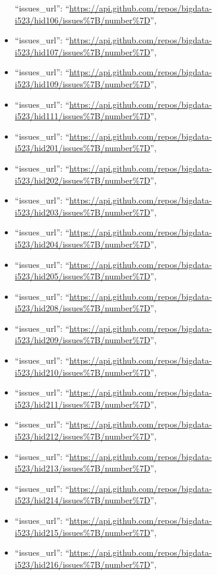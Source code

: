 \begin{itemize}
  ``issues\_url'':
  ``\url{https://api.github.com/repos/bigdata-i523/hid106/issues\%7B/number\%7D}'',
\item
  ``issues\_url'':
  ``\url{https://api.github.com/repos/bigdata-i523/hid107/issues\%7B/number\%7D}'',
\item
  ``issues\_url'':
  ``\url{https://api.github.com/repos/bigdata-i523/hid109/issues\%7B/number\%7D}'',
\item
  ``issues\_url'':
  ``\url{https://api.github.com/repos/bigdata-i523/hid111/issues\%7B/number\%7D}'',
\item
  ``issues\_url'':
  ``\url{https://api.github.com/repos/bigdata-i523/hid201/issues\%7B/number\%7D}'',
\item
  ``issues\_url'':
  ``\url{https://api.github.com/repos/bigdata-i523/hid202/issues\%7B/number\%7D}'',
\item
  ``issues\_url'':
  ``\url{https://api.github.com/repos/bigdata-i523/hid203/issues\%7B/number\%7D}'',
\item
  ``issues\_url'':
  ``\url{https://api.github.com/repos/bigdata-i523/hid204/issues\%7B/number\%7D}'',
\item
  ``issues\_url'':
  ``\url{https://api.github.com/repos/bigdata-i523/hid205/issues\%7B/number\%7D}'',
\item
  ``issues\_url'':
  ``\url{https://api.github.com/repos/bigdata-i523/hid208/issues\%7B/number\%7D}'',
\item
  ``issues\_url'':
  ``\url{https://api.github.com/repos/bigdata-i523/hid209/issues\%7B/number\%7D}'',
\item
  ``issues\_url'':
  ``\url{https://api.github.com/repos/bigdata-i523/hid210/issues\%7B/number\%7D}'',
\item
  ``issues\_url'':
  ``\url{https://api.github.com/repos/bigdata-i523/hid211/issues\%7B/number\%7D}'',
\item
  ``issues\_url'':
  ``\url{https://api.github.com/repos/bigdata-i523/hid212/issues\%7B/number\%7D}'',
\item
  ``issues\_url'':
  ``\url{https://api.github.com/repos/bigdata-i523/hid213/issues\%7B/number\%7D}'',
\item
  ``issues\_url'':
  ``\url{https://api.github.com/repos/bigdata-i523/hid214/issues\%7B/number\%7D}'',
\item
  ``issues\_url'':
  ``\url{https://api.github.com/repos/bigdata-i523/hid215/issues\%7B/number\%7D}'',
\item
  ``issues\_url'':
  ``\url{https://api.github.com/repos/bigdata-i523/hid216/issues\%7B/number\%7D}'',

\end{itemize}

